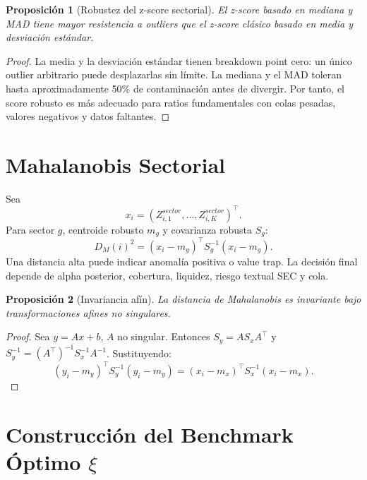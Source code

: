 \documentclass[11pt,letterpaper]{article}
\newtheorem{proposition}{Proposición}
\newcommand{\1}{\mathbbm{1}}
\begin{document}
\begin{proposition}[Robustez del z-score sectorial]
El z-score basado en mediana y MAD tiene mayor resistencia a outliers que el z-score clásico basado en media y desviación estándar.
\end{proposition}

\begin{proof}
La media y la desviación estándar tienen breakdown point cero: un único outlier arbitrario puede desplazarlas sin límite. La mediana y el MAD toleran hasta aproximadamente 50\% de contaminación antes de divergir. Por tanto, el score robusto es más adecuado para ratios fundamentales con colas pesadas, valores negativos y datos faltantes.
\end{proof}

\section{Mahalanobis Sectorial}

Sea
\[
  x_i=(Z_{i,1}^{sector},\dots,Z_{i,K}^{sector})^\top.
\]
Para sector \(g\), centroide robusto \(m_g\) y covarianza robusta \(S_g\):
\[
  D_M(i)^2=(x_i-m_g)^\top S_g^{-1}(x_i-m_g).
\]
Una distancia alta puede indicar anomalía positiva o value trap. La decisión final depende de alpha posterior, cobertura, liquidez, riesgo textual SEC y cola.

\begin{proposition}[Invariancia afín]
La distancia de Mahalanobis es invariante bajo transformaciones afines no singulares.
\end{proposition}

\begin{proof}
Sea \(y=Ax+b\), \(A\) no singular. Entonces \(S_y=AS_xA^\top\) y \(S_y^{-1}=(A^\top)^{-1}S_x^{-1}A^{-1}\). Sustituyendo:
\[
(y_i-m_y)^\top S_y^{-1}(y_i-m_y)
=(x_i-m_x)^\top S_x^{-1}(x_i-m_x).
\]
\end{proof}

\section{Construcción del Benchmark Óptimo \texorpdfstring{\(\xi\)}{xi}}
\end{document}
